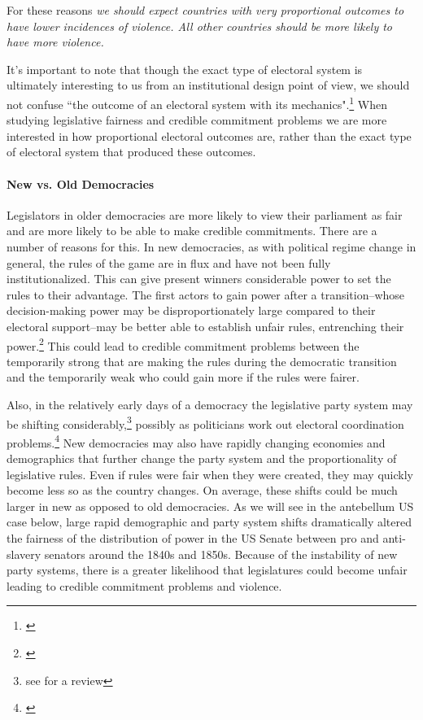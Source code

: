\documentclass[a4paper]{article}\usepackage[]{graphicx}\usepackage[]{color}
\begin{document}
For these reasons \emph{we should expect countries with very proportional outcomes to have lower incidences of violence. All other countries should be more likely to have more violence.} 

It's important to note that though the exact type of electoral system is ultimately interesting to us from an institutional design point of view, we should not confuse ``the outcome of an electoral system with its mechanics".\footnote{\citealt[][109]{Golder2005}} When studying legislative fairness and credible commitment problems we are more interested in how proportional electoral outcomes are, rather than the exact type of electoral system that produced these outcomes. 

\paragraph{New vs. Old Democracies}

Legislators in older democracies are more likely to view their parliament as fair and are more likely to be able to make credible commitments. There are a number of reasons for this. In new democracies, as with political regime change in general, the rules of the game are in flux and have not been fully institutionalized. This can give present winners considerable power to set the rules to their advantage. The first actors to gain power after a transition--whose decision-making power may be disproportionately large compared to their electoral support--may be better able to establish unfair rules, entrenching their power.\footnote{\citealt[108]{Saideman2002}} This could lead to credible commitment problems between the temporarily strong that are making the rules during the democratic transition and the temporarily weak who could gain more if the rules were fairer. 

Also, in the relatively early days of a democracy the legislative party system may be shifting considerably,\footnote{see \citealt[161]{Mainwaring2007b} for a review} possibly as politicians work out electoral coordination problems.\footnote{\citealt{cox1997}} New democracies may also have rapidly changing economies and demographics that further change the party system and the proportionality of legislative rules. Even if rules were fair when they were created, they may quickly become less so as the country changes. On average, these shifts could be much larger in new as opposed to old democracies. As we will see in the antebellum US case below, large rapid demographic and party system shifts dramatically altered the fairness of the distribution of power in the US Senate between pro and anti-slavery senators around the 1840s and 1850s. Because of the instability of new party systems, there is a greater likelihood that legislatures could become unfair leading to credible commitment problems and violence.
\end{document}
